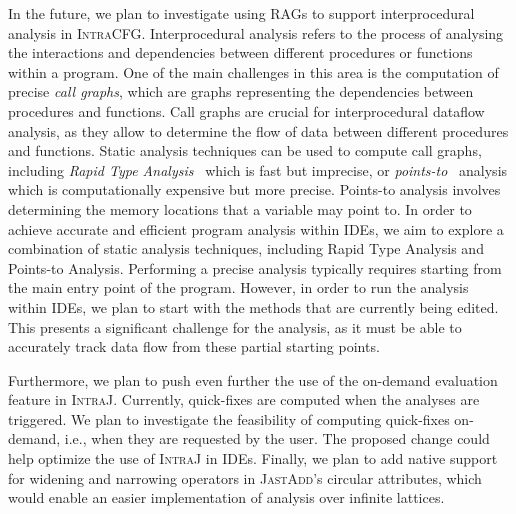 In the future, we plan to investigate using RAGs to support interprocedural analysis in \textsc{IntraCFG}.
Interprocedural analysis refers to the process of analysing
the interactions and dependencies between different procedures or functions within a
program. One of the main challenges in this area is the computation of precise \emph{call graphs},
which are graphs representing the dependencies between procedures and functions.
Call graphs are crucial for interprocedural dataflow analysis, as they allow to determine
the flow of data between different procedures and functions.
Static analysis techniques can be used to compute call graphs, including \emph{Rapid
Type Analysis}~\cite{bacon1996fast} which is fast but imprecise, or \emph{points-to}~\cite{steensgaard1996points} analysis which is 
computationally expensive but more precise. Points-to analysis involves determining 
the memory locations that a variable may point to. 
In order to achieve accurate and efficient program analysis within IDEs,
we aim to explore a combination of static analysis techniques, including
Rapid Type Analysis and Points-to Analysis. 
Performing a precise analysis typically requires starting from the main entry 
point of the program. However, in order to run the analysis within IDEs, we plan 
to start with the methods that are currently being edited. This presents a significant 
challenge for the analysis, as it must be able to accurately track data flow from 
these partial starting points.

Furthermore, we plan to push even further the use of the on-demand evaluation
feature in \textsc{IntraJ}. Currently, quick-fixes are computed when the analyses are triggered.
We plan to investigate the feasibility of computing quick-fixes on-demand,
i.e., when they are requested by the user.
The proposed change could help optimize the use of \textsc{IntraJ} in IDEs.
Finally, we plan to add native support for widening and narrowing
operators in \textsc{JastAdd}'s circular attributes, which would enable an easier implementation
of analysis over infinite lattices.
